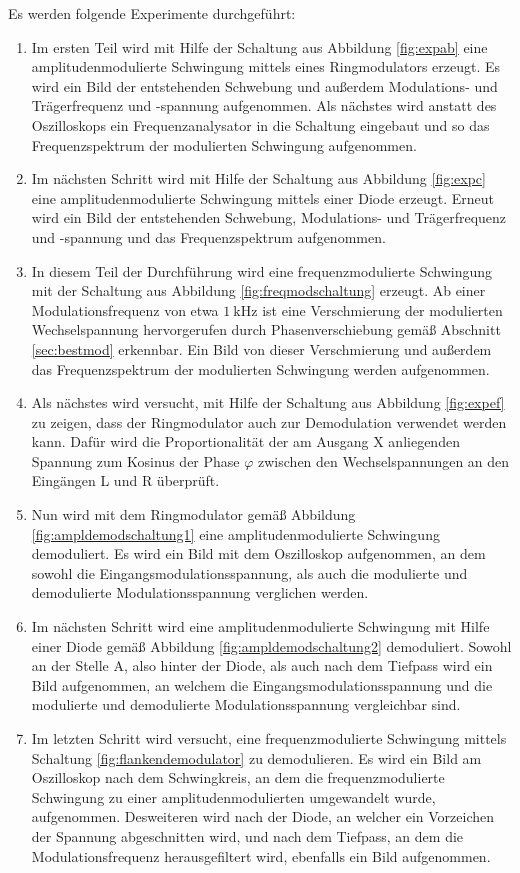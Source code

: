 Es werden folgende Experimente durchgeführt:
\begin{enumerate}
  \item Im ersten Teil wird mit Hilfe der Schaltung aus Abbildung \ref{fig:expab} eine
  amplitudenmodulierte Schwingung mittels eines Ringmodulators erzeugt. Es wird ein
  Bild der entstehenden Schwebung und außerdem Modulations- und Trägerfrequenz und -spannung
  aufgenommen. Als nächstes wird anstatt des Oszilloskops ein Frequenzanalysator in die Schaltung eingebaut
  und so das Frequenzspektrum der modulierten Schwingung aufgenommen.
  \item Im nächsten Schritt wird mit Hilfe der Schaltung aus Abbildung \ref{fig:expc} eine amplitudenmodulierte Schwingung
  mittels einer Diode erzeugt. Erneut wird ein Bild der entstehenden Schwebung, Modulations- und Trägerfrequenz und -spannung und
  das Frequenzspektrum aufgenommen.
  \item In diesem Teil der Durchführung wird eine frequenzmodulierte Schwingung mit der Schaltung aus Abbildung \ref{fig:freqmodschaltung}
  erzeugt. Ab einer Modulationsfrequenz von etwa $\SI{1}{\kilo\hertz}$ ist eine Verschmierung der modulierten Wechselspannung hervorgerufen
  durch Phasenverschiebung gemäß Abschnitt \ref{sec:bestmod} erkennbar. Ein Bild von dieser Verschmierung und außerdem das Frequenzspektrum
  der modulierten Schwingung werden aufgenommen.
  \item Als nächstes wird versucht, mit Hilfe der Schaltung aus Abbildung \ref{fig:expef} zu zeigen, dass der Ringmodulator
  auch zur Demodulation verwendet werden kann. Dafür wird die Proportionalität der am Ausgang X anliegenden Spannung zum
  Kosinus der Phase $\varphi$ zwischen den Wechselspannungen an den Eingängen L und R überprüft.
  \item Nun wird mit dem Ringmodulator gemäß Abbildung \ref{fig:ampldemodschaltung1} eine amplitudenmodulierte Schwingung
  demoduliert. Es wird ein Bild mit dem Oszilloskop aufgenommen, an dem sowohl die Eingangsmodulationsspannung, als auch die
  modulierte und demodulierte Modulationsspannung verglichen werden.
  \item Im nächsten Schritt wird eine amplitudenmodulierte Schwingung mit Hilfe einer Diode gemäß Abbildung \ref{fig:ampldemodschaltung2}
  demoduliert. Sowohl an der Stelle A, also hinter der Diode, als auch nach dem Tiefpass wird ein Bild aufgenommen, an welchem die Eingangsmodulationsspannung und
  die modulierte und demodulierte Modulationsspannung vergleichbar sind.
  \item Im letzten Schritt wird versucht, eine frequenzmodulierte Schwingung mittels Schaltung \ref{fig:flankendemodulator} zu demodulieren.
  Es wird ein Bild am Oszilloskop nach dem Schwingkreis, an dem die frequenzmodulierte Schwingung zu einer amplitudenmodulierten umgewandelt
  wurde, aufgenommen. Desweiteren wird nach der Diode, an welcher ein Vorzeichen der Spannung abgeschnitten wird, und nach dem Tiefpass, an dem die Modulationsfrequenz
  herausgefiltert wird, ebenfalls ein Bild aufgenommen.
\end{enumerate}
